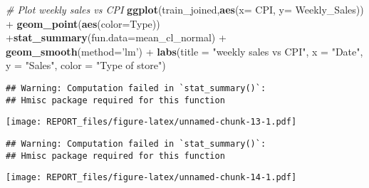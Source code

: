 \documentclass[11pt,]{article}
\newenvironment{Shaded}{\begin{snugshade}}{\end{snugshade}}
\newcommand{\KeywordTok}[1]{\textcolor[rgb]{0.13,0.29,0.53}{\textbf{{#1}}}}
\newcommand{\DataTypeTok}[1]{\textcolor[rgb]{0.13,0.29,0.53}{{#1}}}
\newcommand{\StringTok}[1]{\textcolor[rgb]{0.31,0.60,0.02}{{#1}}}
\newcommand{\CommentTok}[1]{\textcolor[rgb]{0.56,0.35,0.01}{\textit{{#1}}}}
\newcommand{\NormalTok}[1]{{#1}}
\begin{document}
\begin{Shaded}
\begin{Highlighting}[]
\CommentTok{# Plot weekly sales vs CPI}
\KeywordTok{ggplot}\NormalTok{(train_joined,}\KeywordTok{aes}\NormalTok{(}\DataTypeTok{x=} \NormalTok{CPI, }\DataTypeTok{y=} \NormalTok{Weekly_Sales)) +}\StringTok{ }\KeywordTok{geom_point}\NormalTok{(}\KeywordTok{aes}\NormalTok{(}\DataTypeTok{color=}\NormalTok{Type)) +}\KeywordTok{stat_summary}\NormalTok{(}\DataTypeTok{fun.data=}\NormalTok{mean_cl_normal) +}\StringTok{ }
\StringTok{  }\KeywordTok{geom_smooth}\NormalTok{(}\DataTypeTok{method=}\StringTok{'lm'}\NormalTok{) +}\StringTok{ }\KeywordTok{labs}\NormalTok{(}\DataTypeTok{title =} \StringTok{"weekly sales vs CPI"}\NormalTok{, }\DataTypeTok{x =} \StringTok{"Date"}\NormalTok{, }\DataTypeTok{y =} \StringTok{"Sales"}\NormalTok{, }\DataTypeTok{color =} \StringTok{"Type of store"}\NormalTok{)}
\end{Highlighting}
\end{Shaded}

\begin{verbatim}
## Warning: Computation failed in `stat_summary()`:
## Hmisc package required for this function
\end{verbatim}

\texttt{[image: REPORT\_files/figure-latex/unnamed-chunk-13-1.pdf]}

\begin{Shaded}
\end{Shaded}

\begin{verbatim}
## Warning: Computation failed in `stat_summary()`:
## Hmisc package required for this function
\end{verbatim}

\texttt{[image: REPORT\_files/figure-latex/unnamed-chunk-14-1.pdf]}

\begin{Shaded}
\end{Shaded}
\end{document}
